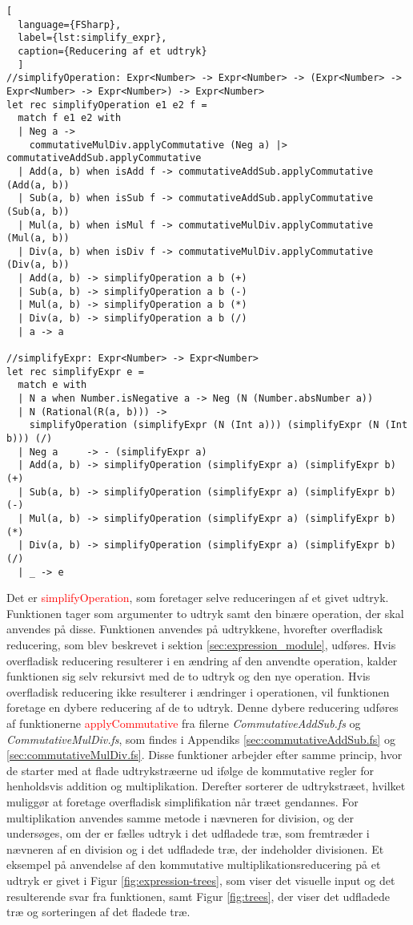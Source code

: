 \begin{lstlisting}[
  language={FSharp}, 
  label={lst:simplify_expr}, 
  caption={Reducering af et udtryk}
  ]
//simplifyOperation: Expr<Number> -> Expr<Number> -> (Expr<Number> -> Expr<Number> -> Expr<Number>) -> Expr<Number>
let rec simplifyOperation e1 e2 f = 
  match f e1 e2 with
  | Neg a -> 
    commutativeMulDiv.applyCommutative (Neg a) |> commutativeAddSub.applyCommutative
  | Add(a, b) when isAdd f -> commutativeAddSub.applyCommutative (Add(a, b))
  | Sub(a, b) when isSub f -> commutativeAddSub.applyCommutative (Sub(a, b))
  | Mul(a, b) when isMul f -> commutativeMulDiv.applyCommutative (Mul(a, b))
  | Div(a, b) when isDiv f -> commutativeMulDiv.applyCommutative (Div(a, b))
  | Add(a, b) -> simplifyOperation a b (+)
  | Sub(a, b) -> simplifyOperation a b (-)
  | Mul(a, b) -> simplifyOperation a b (*)
  | Div(a, b) -> simplifyOperation a b (/)
  | a -> a

//simplifyExpr: Expr<Number> -> Expr<Number>
let rec simplifyExpr e =
  match e with
  | N a when Number.isNegative a -> Neg (N (Number.absNumber a))
  | N (Rational(R(a, b))) -> 
    simplifyOperation (simplifyExpr (N (Int a))) (simplifyExpr (N (Int b))) (/)
  | Neg a     -> - (simplifyExpr a)
  | Add(a, b) -> simplifyOperation (simplifyExpr a) (simplifyExpr b) (+)
  | Sub(a, b) -> simplifyOperation (simplifyExpr a) (simplifyExpr b) (-)
  | Mul(a, b) -> simplifyOperation (simplifyExpr a) (simplifyExpr b) (*)
  | Div(a, b) -> simplifyOperation (simplifyExpr a) (simplifyExpr b) (/)
  | _ -> e 
\end{lstlisting}

Det er \textcolor{red}{simplifyOperation}, som foretager selve reduceringen af et givet udtryk. Funktionen tager som argumenter to udtryk samt den binære operation, der skal anvendes på disse. Funktionen anvendes på udtrykkene, hvorefter overfladisk reducering, som blev beskrevet i sektion \ref{sec:expression_module}, udføres. Hvis overfladisk reducering resulterer i en ændring af den anvendte operation, kalder funktionen sig selv rekursivt med de to udtryk og den nye operation. Hvis overfladisk reducering ikke resulterer i ændringer i operationen, vil funktionen foretage en dybere reducering af de to udtryk. Denne dybere reducering udføres af funktionerne \textcolor{red}{applyCommutative} fra filerne \textit{CommutativeAddSub.fs} og \textit{CommutativeMulDiv.fs}, som findes i Appendiks \ref{sec:commutativeAddSub.fs} og \ref{sec:commutativeMulDiv.fs}. Disse funktioner arbejder efter samme princip, hvor de starter med at flade udtrykstræerne ud ifølge de kommutative regler for henholdsvis addition og multiplikation. Derefter sorterer de udtrykstræet, hvilket muliggør at foretage overfladisk simplifikation når træet gendannes. For multiplikation anvendes samme metode i nævneren for division, og der undersøges, om der er fælles udtryk i det udfladede træ, som fremtræder i nævneren af en division og i det udfladede træ, der indeholder divisionen. Et eksempel på anvendelse af den kommutative multiplikationsreducering på et udtryk er givet i Figur \ref{fig:expression-trees}, som viser det visuelle input og det resulterende svar fra funktionen, samt Figur \ref{fig:trees}, der viser det udfladede træ og sorteringen af det fladede træ.


